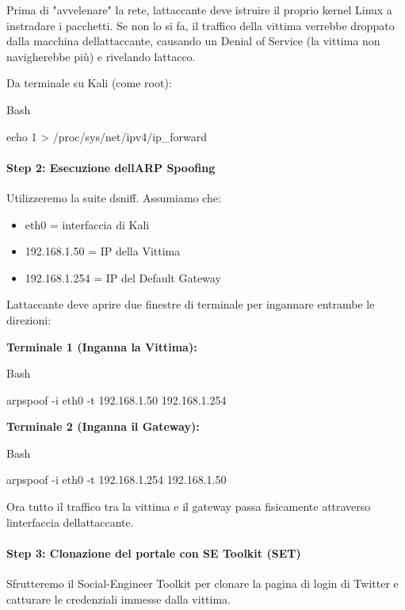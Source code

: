 \documentclass[11pt,a4paper]{article}
\begin{document}
Prima di "avvelenare" la rete, l\textquotesingle attaccante deve
istruire il proprio kernel Linux a instradare i pacchetti. Se non lo si
fa, il traffico della vittima verrebbe droppato dalla macchina
dell\textquotesingle attaccante, causando un Denial of Service (la
vittima non navigherebbe più) e rivelando l\textquotesingle attacco.

Da terminale su Kali (come root):

Bash

echo 1 \textgreater{} /proc/sys/net/ipv4/ip\_forward

\paragraph{Step 2: Esecuzione dell\textquotesingle ARP
Spoofing}\label{step-2-esecuzione-dellarp-spoofing}

Utilizzeremo la suite dsniff. Assumiamo che:

\begin{itemize}
\item
  eth0 = interfaccia di Kali
\item
  192.168.1.50 = IP della Vittima
\item
  192.168.1.254 = IP del Default Gateway
\end{itemize}

L\textquotesingle attaccante deve aprire due finestre di terminale per
ingannare entrambe le direzioni:

\textbf{Terminale 1 (Inganna la Vittima):}

Bash

arpspoof -i eth0 -t 192.168.1.50 192.168.1.254

\textbf{Terminale 2 (Inganna il Gateway):}

Bash

arpspoof -i eth0 -t 192.168.1.254 192.168.1.50

Ora tutto il traffico tra la vittima e il gateway passa fisicamente
attraverso l\textquotesingle interfaccia
dell\textquotesingle attaccante.

\paragraph{Step 3: Clonazione del portale con SE Toolkit
(SET)}\label{step-3-clonazione-del-portale-con-se-toolkit-set}

Sfrutteremo il Social-Engineer Toolkit per clonare la pagina di login di
Twitter e catturare le credenziali immesse dalla vittima.
\end{document}

